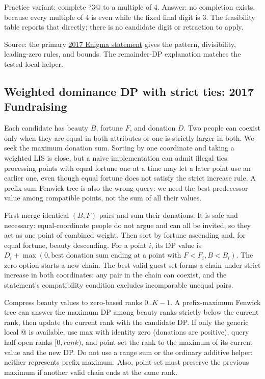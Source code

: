 Practice variant: complete \verb@?3@ to a multiple of 4. Answer: no
completion exists, because every multiple of 4 is even while the fixed final
digit is 3. The feasibility table reports that directly; there is no
candidate digit or retraction to apply.

Source: the primary \href{https://maratona.ime.usp.br/hist/2017/resultados/contest.pdf}{2017 Enigma statement} gives the pattern, divisibility, leading-zero rules, and bounds. The remainder-DP explanation matches the tested local helper.

\subsection{Weighted dominance DP with strict ties: 2017 Fundraising}
\label{case:fundraising}

Each candidate has beauty $B$, fortune $F$, and donation $D$. Two people
can coexist only when they are equal in both attributes or one is strictly
larger in both. We seek the maximum donation sum. Sorting by one coordinate
and taking a weighted LIS is close, but a naive implementation can admit
illegal ties: processing points with equal fortune one at a time may let a
later point use an earlier one, even though equal fortune does not satisfy
the strict increase rule. A prefix sum Fenwick tree is also the wrong query:
we need the best predecessor value among compatible points, not the sum of
all their values.

First merge identical $(B,F)$ pairs and sum their donations. It is safe and
necessary: equal-coordinate people do not argue and can all be invited, so
they act as one point of combined weight. Then sort by fortune ascending and,
for equal fortune, beauty descending. For a point $i$, its DP value is
$D_i+\max(0,\text{best donation sum ending at a point with }F<F_i,B<B_i)$.
The zero option starts a new chain. The best valid guest set forms a chain
under strict increase in both coordinates: any pair in the chain can
coexist, and the statement's compatibility condition excludes incomparable
unequal pairs.

Compress beauty values to zero-based ranks $0..K-1$. A prefix-maximum
Fenwick tree can answer the maximum DP among beauty ranks strictly below the current rank,
then update the current rank with the candidate DP. If only the generic local
@ is available, use max with identity zero (donations are
positive), query half-open ranks $[0,rank)$, and point-set the rank to the
maximum of its current value and the new DP. Do not use a range sum or the
ordinary additive \verb@Fenwick@ helper: neither represents prefix maximum.
Also, point-set must preserve the previous maximum if another valid chain
ends at the same rank.

